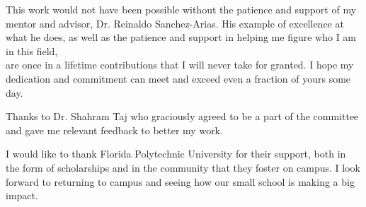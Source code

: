 %
%
%

\begin{acknowledgments}
This work would not have been possible without the patience and support of my mentor and advisor, Dr. Reinaldo Sanchez-Arias. His example of excellence at what he does, as well as the patience and support in helping me figure who I am in this field, \\
are once in a lifetime contributions that I will never take for granted. I hope my dedication and commitment can meet and exceed even a fraction of yours some day.

Thanks to Dr. Shahram Taj who graciously agreed to be a part of the committee and gave me relevant feedback to better my work.

I would like to thank Florida Polytechnic University for their support, both in the form of scholarships and in the community that they foster on campus. I look forward to returning to campus and seeing how our small school is making a big impact. 
\end{acknowledgments}

\pagebreak